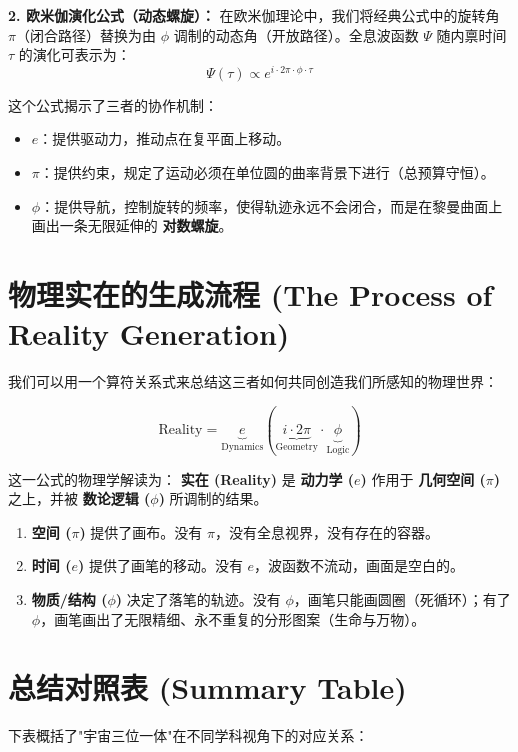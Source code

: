 \textbf{2. 欧米伽演化公式（动态螺旋）：}
在欧米伽理论中，我们将经典公式中的旋转角 $\pi$（闭合路径）替换为由 $\phi$ 调制的动态角（开放路径）。全息波函数 $\Psi$ 随内禀时间 $\tau$ 的演化可表示为：
\[\Psi(\tau) \propto e^{i \cdot 2\pi \cdot \phi \cdot \tau}\]

这个公式揭示了三者的协作机制：

\begin{itemize}
\item \textbf{$e$}：提供驱动力，推动点在复平面上移动。
\item \textbf{$\pi$}：提供约束，规定了运动必须在单位圆的曲率背景下进行（总预算守恒）。
\item \textbf{$\phi$}：提供导航，控制旋转的频率，使得轨迹永远不会闭合，而是在黎曼曲面上画出一条无限延伸的 \textbf{对数螺旋}。
\end{itemize}

\section{物理实在的生成流程 (The Process of Reality Generation)}

我们可以用一个算符关系式来总结这三者如何共同创造我们所感知的物理世界：

\[\text{Reality} = \underbrace{e}_{\text{Dynamics}} \left( \underbrace{i \cdot 2\pi}_{\text{Geometry}} \cdot \underbrace{\phi}_{\text{Logic}} \right)\]

这一公式的物理学解读为：
\textbf{实在 (Reality)} 是 \textbf{动力学 ($e$)} 作用于 \textbf{几何空间 ($\pi$)} 之上，并被 \textbf{数论逻辑 ($\phi$)} 所调制的结果。

\begin{enumerate}
\item  \textbf{空间 ($\pi$)} 提供了画布。没有 $\pi$，没有全息视界，没有存在的容器。
\item  \textbf{时间 ($e$)} 提供了画笔的移动。没有 $e$，波函数不流动，画面是空白的。
\item  \textbf{物质/结构 ($\phi$)} 决定了落笔的轨迹。没有 $\phi$，画笔只能画圆圈（死循环）；有了 $\phi$，画笔画出了无限精细、永不重复的分形图案（生命与万物）。
\end{enumerate}

\section{总结对照表 (Summary Table)}

下表概括了"宇宙三位一体"在不同学科视角下的对应关系：

